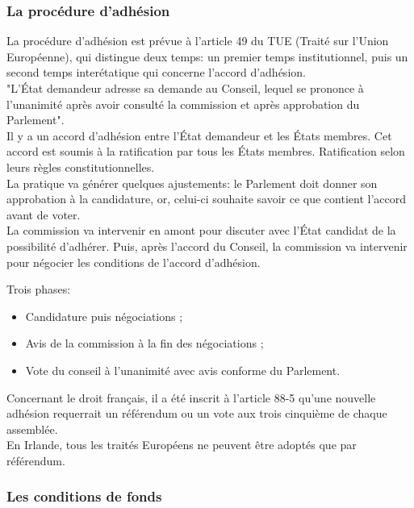 \documentclass[12pt, a4paper, openany]{book}
\begin{document}
\subsubsection{La procédure d'adhésion}

La procédure d'adhésion est prévue à l'article 49 du TUE (Traité sur l'Union Européenne), qui distingue deux temps: un premier temps institutionnel, puis un second temps interétatique qui concerne l'accord d'adhésion. \\
"L'État demandeur adresse sa demande au Conseil, lequel se prononce à l'unanimité après avoir consulté la commission et après approbation du Parlement". \\
Il y a un accord d'adhésion entre l'État demandeur et les États membres. Cet accord est soumis à la ratification par tous les États membres. Ratification selon leurs règles constitutionnelles. \\
La pratique va générer quelques ajustements: le Parlement doit donner son approbation à la candidature, or, celui-ci souhaite savoir ce que contient l'accord avant de voter. \\
La commission va intervenir en amont pour discuter avec l'État candidat de la possibilité d'adhérer. Puis, après l'accord du Conseil, la commission va intervenir pour négocier les conditions de l'accord d'adhésion. 


Trois phases:
\begin{itemize}
\item Candidature puis négociations ;
\item Avis de la commission à la fin des négociations ;
\item Vote du conseil à l'unanimité avec avis conforme du Parlement.
\end{itemize}


Concernant le droit français, il a été inscrit à l'article 88-5 qu'une nouvelle adhésion requerrait un référendum ou un vote aux trois cinquième de chaque assemblée. \\
En Irlande, tous les traités Européens ne peuvent être adoptés que par référendum.  

\subsubsection{Les conditions de fonds}
\end{document}
